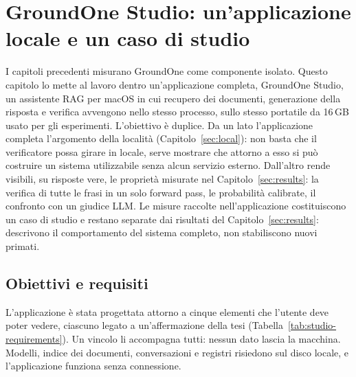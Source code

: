 \chapter{GroundOne Studio: un'applicazione locale e un caso di studio}
\label{ch:studio}


I capitoli precedenti misurano GroundOne come componente isolato. Questo capitolo lo mette al lavoro dentro
un'applicazione completa, GroundOne Studio, un assistente RAG per macOS in cui recupero dei documenti, generazione della
risposta e verifica avvengono nello stesso processo, sullo stesso portatile da 16\,GB usato per gli esperimenti. L'obiettivo
è duplice. Da un lato l'applicazione completa l'argomento della località (Capitolo~\ref{sec:local}): non basta che il
verificatore possa girare in locale, serve mostrare che attorno a esso si può costruire un sistema utilizzabile senza alcun
servizio esterno. Dall'altro rende visibili, su risposte vere, le proprietà misurate nel Capitolo~\ref{sec:results}: la
verifica di tutte le frasi in un solo forward pass, le probabilità calibrate, il confronto con un giudice LLM.
Le misure raccolte nell'applicazione costituiscono un caso di studio e restano separate dai risultati del
Capitolo~\ref{sec:results}: descrivono il comportamento del sistema completo, non stabiliscono nuovi primati.

\section{Obiettivi e requisiti}
\label{sec:studio-goals}

L'applicazione è stata progettata attorno a cinque elementi che l'utente deve poter vedere, ciascuno legato a
un'affermazione della tesi (Tabella~\ref{tab:studio-requirements}). Un vincolo li accompagna tutti: nessun dato lascia la
macchina. Modelli, indice dei documenti, conversazioni e registri risiedono sul disco locale, e l'applicazione funziona
senza connessione.

